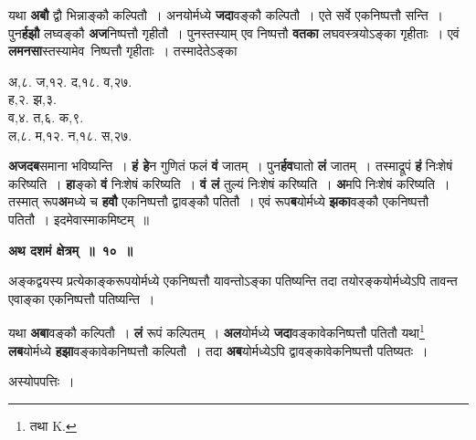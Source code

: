 \documentclass[11pt, openany]{book}
\begin{document}
\begin{flushleft}
\begin{minipage}[t]{0.6\textwidth}
\hspace{4mm} यथा \textbf{अबौ} द्वौ भिन्नाङ्कौ कल्पितौ~। अनयोर्मध्ये \textbf{जदा}वङ्कौ कल्पितौ~। एते सर्वे एकनिष्पत्तौ सन्ति~। पुन\textbf{र्हझौ} लघ्वङ्कौ \textbf{अज}निष्पत्तौ गृहीतौ~। पुनस्तस्याम् एव निष्पत्तौ \textbf{वतका} लघवस्त्रयोऽङ्का गृहीताः~। एवं \textbf{लमनसा}स्तस्यामेव \,निष्पत्तौ गृहीताः~। तस्मादेतेऽङ्का
\end{minipage} 
\hfill
\begin{minipage}[t]{0.3\textwidth}
अ,८. ज,१२. द,१८. व,२७.\\
ह,२. झ,३.\\
व,४. त,६. क,९.\\
ल,८. म,१२. न,१८. स,२७.
\end{minipage}
\end{flushleft}
\vspace{-3mm}

\noindent \textbf{अजदब}समाना भविष्यन्ति~। \textbf{हं हे}न गुणितं फलं \textbf{वं} जातम्~। पुन\textbf{र्हव}घातो \textbf{लं} जातम्~। तस्माद्रूपं \textbf{हं} निःशेषं करिष्यति~। \textbf{हा}ङ्को \textbf{वं} निःशेषं करिष्यति~। \textbf{वं लं} तुल्यं निःशेषं करिष्यति~। \textbf{अ}मपि निःशेषं करिष्यति~। तस्मात् रूप\textbf{अ}मध्ये च \textbf{हवौ} एकनिष्पत्तौ द्वावङ्कौ पतितौ~। एवं रूप\textbf{ब}योर्मध्ये \textbf{झका}वङ्कौ एकनिष्पत्तौ पतितौ~। इदमेवास्माकमिष्टम्~॥ 
\vspace{2mm}

\begin{center}
\textbf{\large अथ दशमं क्षेत्रम्~॥~१०~॥}
\end{center}

 {\ab अङ्कद्वयस्य प्रत्येकाङ्करूपयोर्मध्ये एकनिष्पत्तौ यावन्तोऽङ्का पतिष्यन्ति तदा तयोरङ्कयोर्मध्येऽपि तावन्त एवाङ्का एकनिष्पत्तौ पतिष्यन्ति~।} 

\newpage
यथा \textbf{अबा}वङ्कौ कल्पितौ~। \textbf{लं} रूपं कल्पितम्~। \textbf{अल}योर्मध्ये \textbf{जदा}वङ्कावेकनिष्पत्तौ पतितौ यथा\renewcommand{\thefootnote}{१}\footnote{तथा {\en K.}} \textbf{लब}योर्मध्ये \textbf{हझा}वङ्कावेकनिष्पत्तौ कल्पितौ~। तदा \textbf{अब}योर्मध्येऽपि द्वावङ्कावेकनिष्पत्तौ पतिष्यतः~। 

\begin{center}
अस्योपपत्तिः~।
\end{center}
\end{document}
